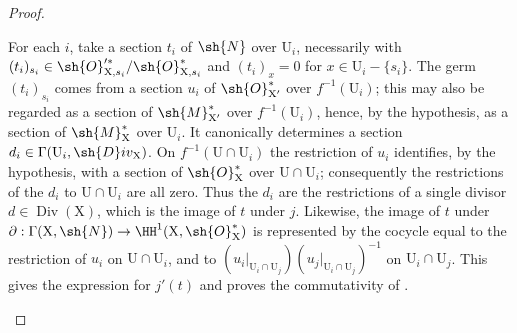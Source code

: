 \begin{proof}
\begin{enumerate}[label=(\roman*)]
For each $i$, take a section $t_i$ of $\sh{N}$ over $\mathrm{U}_i$, necessarily with $(t_i)_{s_i}\in\sh{O}'^{*}_{\mathrm{X},s_i}/\sh{O}^*_{\mathrm{X},s_i}$ and $(t_i)_x=0$ for $x\in\mathrm{U}_i-\{s_i\}$.
The germ $(t_i)_{s_i}$ comes from a section $u_i$ of $\sh{O}^*_{\mathrm{X}'}$ over $f^{-1}(\mathrm{U}_i)$; this may also be regarded as a section of $\sh{M}^*_{\mathrm{X}'}$ over $f^{-1}(\mathrm{U}_i)$, hence, by the hypothesis, as a section of $\sh{M}^*_{\mathrm{X}}$ over $\mathrm{U}_i$.
It canonically determines a section $d_i\in\Gamma(\mathrm{U}_i,\sh{D}iv_\mathrm{X})$.
On $f^{-1}(\mathrm{U}\cap\mathrm{U}_i)$ the restriction of $u_i$ identifies, by the hypothesis, with a section of $\sh{O}^*_{\mathrm{X}}$ over $\mathrm{U}\cap\mathrm{U}_i$; consequently the restrictions of the $d_i$ to $\mathrm{U}\cap\mathrm{U}_i$ are all zero.
Thus the $d_i$ are the restrictions of a single divisor $d\in\operatorname{Div}(\mathrm{X})$, which is the image of $t$ under $j$.
Likewise, the image of $t$ under $\partial:\Gamma(\mathrm{X},\sh{N})\to\HH^1(\mathrm{X},\sh{O}^*_{\mathrm{X}})$ is represented by the cocycle equal to the restriction of $u_i$ on $\mathrm{U}\cap\mathrm{U}_i$, and to
$(u_i|_{\mathrm{U}_i\cap\mathrm{U}_j})(u_j|_{\mathrm{U}_i\cap\mathrm{U}_j})^{-1}$ on $\mathrm{U}_i\cap\mathrm{U}_j$.
This gives the expression for $j'(t)$ and proves the commutativity of .
\end{enumerate}
\end{proof}

